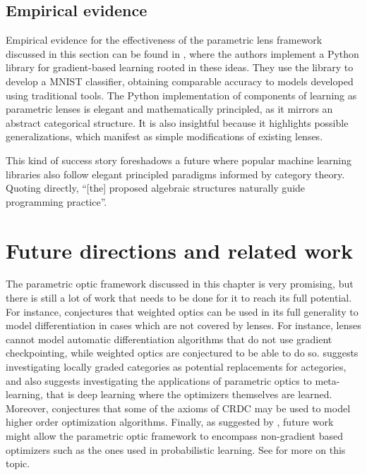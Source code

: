 \documentclass[11pt,a4paper,openright,twoside]{report}
\theoremstyle{plain}
\theoremstyle{definition}
\newcommand\dblquote[1]{\textquotedblleft #1\textquotedblright}
\begin{document}
\subsection{Empirical evidence}

Empirical evidence for the effectiveness of the parametric lens framework discussed in this section can be found in \cite{cruttwell2022categorical}, where the authors implement a Python library for gradient-based learning rooted in these ideas. They use the library to develop a MNIST classifier, obtaining comparable accuracy to models developed using traditional tools. The Python implementation of components of learning as parametric lenses is elegant and mathematically principled, as it mirrors an abstract categorical structure. It is also insightful because it highlights possible generalizations, which manifest as simple modifications of existing lenses. 

This kind of success story foreshadows a future where popular machine learning libraries also follow elegant principled paradigms informed by category theory. Quoting  \cite{cruttwell2022categorical} directly, \dblquote{[the] proposed algebraic structures naturally guide programming practice}.

\section{Future directions and related work}

The parametric optic framework discussed in this chapter is very promising, but there is still a lot of work that needs to be done for it to reach its full potential. For instance, \cite{gavranovic2024fundamental} conjectures that weighted optics can be used in its full generality to model differentiation in cases which are not covered by lenses. For instance, lenses cannot model automatic differentiation algorithms that do not use gradient checkpointing, while weighted optics are conjectured to be able to do so. \cite{gavranovic2024fundamental} suggests investigating locally graded categories as potential replacements for actegories, and also suggests investigating the applications of parametric optics to meta-learning, that is deep learning where the optimizers themselves are learned. Moreover, \cite{cruttwell2022categorical} conjectures that some of the axioms of CRDC may be used to model higher order optimization algorithms. Finally, as suggested by \cite{cruttwell2022categorical}, future work might allow the parametric optic framework to encompass non-gradient based optimizers such as the ones used in probabilistic learning. See \cite{shiebler2021category} for more on this topic.
\end{document}
